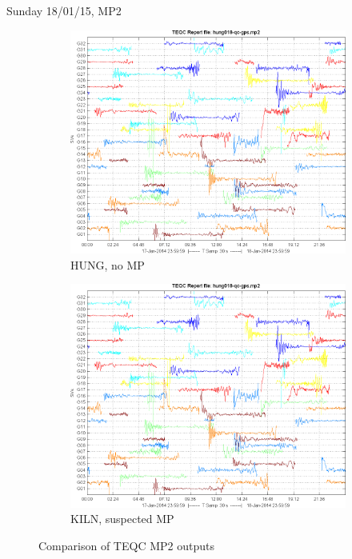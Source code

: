 \documentclass[11pt]{beamer}
\begin{document}
{\begin{frame}{Sunday 18/01/15, MP2}
	\begin{figure}
		\centering
		\begin{subfigure}{.5\textwidth}
			\centering
			\includegraphics[width=\textwidth]{pic/hung018_qc_gps_mp2.png}
			\caption{HUNG, no MP}
			\label{fig:sub1}
		\end{subfigure}%
		\begin{subfigure}{.5\textwidth}
			\centering
			\includegraphics[width=\textwidth]{pic/hung018_qc_gps_mp2.png}
			\caption{KILN, suspected MP}
			\label{fig:sub2}
		\end{subfigure}
		\caption{Comparison of TEQC MP2 outputs}
	\end{figure}
\end{frame}	

}
\end{document}
